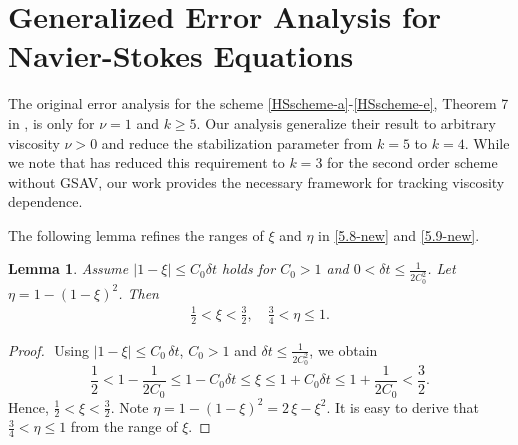 \documentclass{article}
\newtheorem{lemma}[theorem]{Lemma}          %
\theoremstyle{definition}                   %
\begin{document}
\section{Generalized Error Analysis for Navier-Stokes Equations}
\label{sec_error_analysis}
The original error analysis for the scheme \eqref{HSscheme-a}-\eqref{HSscheme-e}, Theorem 7 in \cite{HuangShen2023}, is only for $\nu=1$ and $k\ge 5$.
Our analysis generalize their result to arbitrary viscosity $\nu > 0$ and reduce the stabilization parameter from $k=5$ to $k=4$. While we note that \cite{HuangShen2025} has reduced this requirement to $k=3$ for the second order scheme without GSAV, our work provides the necessary framework for tracking viscosity dependence.

%
The following lemma refines the ranges of $\xi$ and $\eta$ in \eqref{5.8-new} and \eqref{5.9-new}.
\begin{lemma}
\label{lemma_xi_eta}
Assume $|1-\xi| \le C_0 \delta t$ holds for $C_0>1$ and 
$0<\delta t \le \frac{1}{2C_0^2}$. 
Let $\eta=1-(1-\xi)^2$.
Then 
\begin{align}
\tfrac{1}{2} < \xi < \tfrac{3}{2},\quad 
\tfrac34 < \eta \le 1.
\label{estimate_xi_eta}
\end{align}
\end{lemma}
\begin{proof}
$ $\newline
Using $|1-\xi| \le C_0\,\delta t$, $C_0>1$ and 
$\delta t \le \frac{1}{2C_0^2}$,  
we obtain
\[
\frac{1}{2}
< 1 - \frac{1}{2C_0} \le 1 - C_0\delta t
\le \xi \le 1 + C_0\delta t
\le 1 + \frac{1}{2C_0} < \frac{3}{2}.
\]
Hence, $\frac{1}{2} < \xi < \tfrac{3}{2}$. 
Note $\eta= 1-(1-\xi)^{2}=2\,\xi- \xi^{2}$.
It is easy to derive that $\frac{3}{4}< \eta \le 1$ from the range of $\xi$.

\end{proof}
\end{document}

